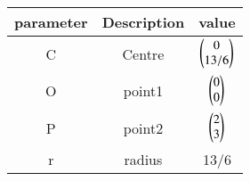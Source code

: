 \begin{tabular}[12pt]{ |c| c| c|}
    \hline
	parameter & Description & value \\ 
    \hline
	 C & Centre & $\begin{pmatrix}0\\ 13/6\end{pmatrix}$\\
    \hline 
	 O & point1 & $\begin{pmatrix}0\\0\end{pmatrix}$\\
    \hline
	 P & point2 & $\begin{pmatrix}2\\3\end{pmatrix}$\\
    \hline   
	 r & radius & 13/6\\
    \hline
    \end{tabular}
